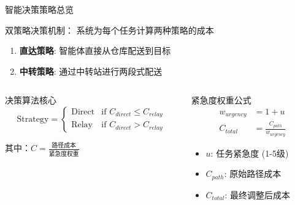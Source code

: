 \documentclass[
10pt,
aspectratio=169,
]{beamer}
\begin{document}
\begin{frame}{智能决策策略总览}
    \begin{block}{双策略决策机制：        系统为每个任务计算两种策略的成本}

        \begin{enumerate}
            \item \textbf{直达策略}: 智能体直接从仓库配送到目标
            \item \textbf{中转策略}: 通过中转站进行两段式配送
        \end{enumerate}
    \end{block}
    
    \begin{columns}
        \begin{column}{0.5\textwidth}
            \begin{alertblock}{决策算法核心}
                \begin{equation}
                \text{Strategy} = \begin{cases}
                \text{Direct} & \text{if } C_{direct} \leq C_{relay} \\
                \text{Relay} & \text{if } C_{direct} > C_{relay}
                \end{cases}
                \end{equation}
                
                其中：$C = \frac{\text{路径成本}}{\text{紧急度权重}}$
            \end{alertblock}
        \end{column}
        \begin{column}{0.5\textwidth}
            \begin{exampleblock}{紧急度权重公式}
                \begin{align}
                    w_{urgency} &= 1 + u \\
                    C_{total} &= \frac{C_{path}}{w_{urgency}}
                \end{align}
                \begin{itemize}
                    \item $u$: 任务紧急度 (1-5级)
                    \item $C_{path}$: 原始路径成本
                    \item $C_{total}$: 最终调整后成本
                \end{itemize}
            \end{exampleblock}
        \end{column}
    \end{columns}
\end{frame}
\end{document}
